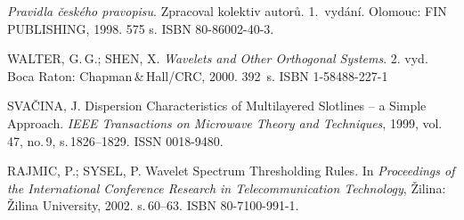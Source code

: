 \begin{thebibliography}{99}
    \emph{Pravidla českého pravopisu}.
    Zpracoval kolektiv autorů. 1.\ vydání.
    Olomouc: FIN PUB\-LISH\-ING, 1998. 575 s. ISBN 80-86002-40-3.

	WALTER, G.\,G.; SHEN, X.
	\emph{Wavelets and Other Orthogonal Systems}.
	2. vyd. Boca Raton: Chapman\,\&\,Hall/CRC, 2000. 392~s. ISBN 1-58488-227-1

	SVAČINA, J.
	Dispersion Characteristics of Multilayered Slotlines -- a Simple Approach.
	\emph{IEEE Transactions on Microwave Theory and Techniques},
	1999, vol.\,47, no.\,9, s.\,1826--1829. ISSN 0018-9480.

    RAJMIC, P.; SYSEL, P.
    Wavelet Spectrum Thresholding Rules.
    In \emph{Proceedings of the International Conference Research in Telecommunication Technology},
    Žilina: Žilina University, 2002. s.\,60--63. ISBN 80-7100-991-1.

\end{thebibliography}


%
%
%
